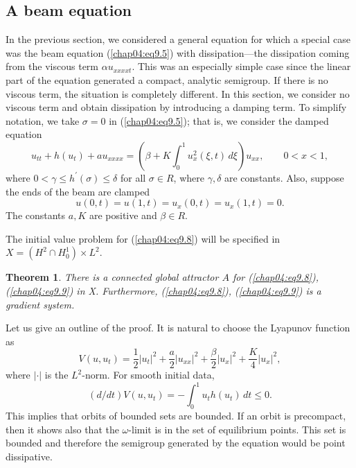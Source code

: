 \documentclass{surv-l}
\theoremstyle{plain}
\newtheorem{theorem}{Theorem}[section]
\theoremstyle{definition}
\numberwithin{equation}{section}
\numberwithin{figure}{chapter}
\begin{document}
\subsection[A Beam equation]{A beam equation}\label{subsec4.9.3}  In the previous section, we considered a general equation for which a special case was the beam equation (\ref{chap04:eq9.5}) with dissipation---the dissipation coming from the viscous term $\alpha u_{xxxxt}$. This was an especially simple case since the linear part of the equation generated a compact, analytic semigroup. If there is no viscous term, the situation is completely different. In this
section, we consider no viscous term and obtain dissipation by introducing a damping term. To simplify notation, we take $\sigma=0$ in (\ref{chap04:eq9.5}); that is, we consider the damped equation
\begin{equation}\label{chap04:eq9.8}
u_{tt}+h(u_{t})+au_{xxxx}=\left(\beta+K\int_{0}^{1}u_{x}^{2}(\xi, t)\,d\xi\right)u_{xx},\qquad 0<x<1,
\end{equation}
where $ 0<\gamma\leq h^{\prime}(\sigma)\leq\delta$ for all $\sigma\in R$, where $\gamma, \delta$ are constants. Also, suppose the ends of the beam are clamped
\begin{equation}\label{chap04:eq9.9}
u(0, t)=u(1, t)=u_{x}(0, t)=u_{x}(1, t)=0.
\end{equation}
The constants $a, K$ are positive and $\beta\in R$.

The initial value problem for (\ref{chap04:eq9.8}) will be specified in $X=(H^{2}\cap H_{0}^{1})\times L^{2}$.


\begin{theorem}\label{thm4.9.3}
There is a connected global attractor $A$ for \emph{(\ref{chap04:eq9.8}), (\ref{chap04:eq9.9})} in
X. Furthermore, \emph{(\ref{chap04:eq9.8}), (\ref{chap04:eq9.9})} is a gradient system.
\end{theorem}

Let us give an outline of the proof. It is natural to choose the Lyapunov function as
\begin{equation*}
V(u, u_{t})=\frac{1}{2}|u_{t}|^{2}+\frac{a}{2}|u_{xx}|^{2}+\frac{\beta}{2}|u_{x}|^{2}+\frac{K}{4}|u_{x}|^{2},
\end{equation*}
where $|\cdot|$ is the $L^{2}$-norm. For smooth initial data,
\begin{equation*}
(d/dt)V(u, u_{t})=-\int_{0}^{1}u_{t}h(u_{t})\,dt\leq 0.
\end{equation*}
This implies that orbits of bounded sets are bounded. If an orbit is precompact, then it shows also that the $\omega$-limit is in the set of equilibrium points. This set is bounded and therefore the semigroup generated by the equation would be point dissipative.
\end{document}
